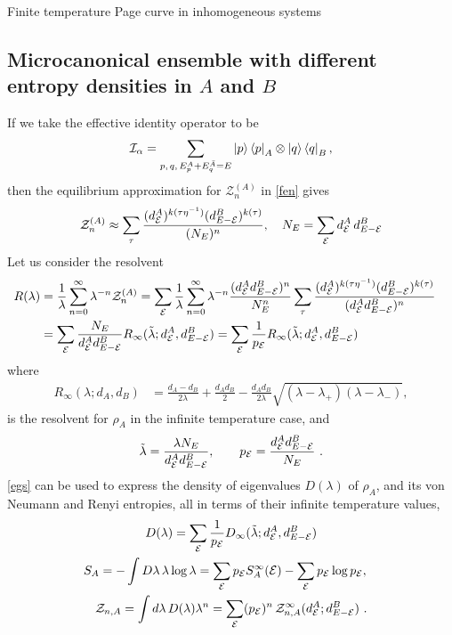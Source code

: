 \documentclass[a4paper,11pt]{article}
\newcommand{\be}{\begin{equation}}
\newcommand{\ee}{\end{equation}}
\newcommand{\bega}{\begin{gather}}
\def\ie{\begin{equation}\begin{aligned}}
\def\fe{\end{aligned}\end{equation}}
\newcommand\al{{\alpha}}
\newcommand\lam{\lambda}
\newcommand\ov{\over}
\newcommand\sE{{\ensuremath{{\mathcal E}}}}
\newcommand\sI{{\ensuremath{{\mathcal I}}}}
\newcommand\sZ{{\mathcal Z}}
\begin{document}
\begin{enumerate}
\begin{appendix}
\begin{section}{Finite temperature Page curve in inhomogeneous systems}
\subsection{Microcanonical ensemble with different entropy densities in $A$ and $B$}
If we take the effective identity operator to be 
\be 
\sI_{\al} = \sum_{p,\, q, \, E^A_p + E^{\bar A}_q = E} \ket{p}\bra{p}_{A} \otimes \ket{q}\bra{q}_{B}, 
\ee
then the equilibrium approximation for $\sZ_n^{(A)}$ in \eqref{fen} gives
\be 
\sZ_n^{(A)} \approx \sum_{\tau} {(d_{\sE}^A)^{k(\tau\eta^{-1})} (d^{B}_{E-\sE})^{k(\tau)} \ov (N_E)^n}, \quad N_E = \sum_{\sE} d_{\sE}^A \, d^{B}_{E-\sE} 
\ee
Let us consider the resolvent 
\ie
R(\lam) & = {1 \ov \lam} \sum_{n=0}^\infty \lam^{-n} \sZ_n^{(A)}
= \sum_{\sE} {1 \ov \lam} \sum_{n=0}^\infty \lam^{-n} \frac{(d_{\sE}^A d^{B}_{E-\sE})^n}{N_E^n} \sum_{\tau} {(d_{\sE}^A)^{k(\tau\eta^{-1})} (d^{B}_{E-\sE})^{k(\tau)} \ov (d_{\sE}^A d^{B}_{E-\sE})^n} \cr
& = \sum_{\sE} {N_E \ov d_{\sE}^A d^{B}_{E-\sE}} R_\infty (\tilde \lam; d_{\sE}^A, d^{B}_{E-\sE})
= \sum_\sE {1 \ov p_\sE} R_\infty (\tilde \lam; d_{\sE}^A, d^{B}_{E-\sE})
\label{egs}
\fe
where
 \begin{align} 
R_\infty (\lambda; d_A, d_{B}) &= \frac{d_A - d_{B}}{2\lambda} + \frac{d_Ad_{B}}{2} - \frac{d_A d_{B}}{2\lambda}\sqrt{\left(\lambda- \lam_+ \right)\left(\lambda-\lam_- \right)}, \label{resolvent}
\end{align}
is the resolvent for $\rho_A$ in the infinite temperature case, and 
\be 
\tilde \lam = {\lam N_E \ov d_{\sE}^A d^{B}_{E-\sE}}, \qquad p_\sE 
= {d_{\sE}^A d^{B}_{E-\sE} \ov N_E } \ .
\ee
\eqref{egs} can be used to express the density of eigenvalues $D(\lambda)$ of $\rho_A$, and its von Neumann and Renyi entropies, all in terms of their infinite temperature values, 
\bega 
D (\lam) = \sum_{\sE} %
{1 \ov p_\sE} D_\infty (\tilde \lam; d_{\sE}^A, d^{B}_{E-\sE}) \\
\label{entropy}
S_A = - \int D \lam \, \lam \log \lam = \sum_\sE p_\sE S_A^{\infty} (\sE) - \sum_\sE p_\sE \log p_{\sE}, \quad 
\\
\label{zn_se}
\sZ_{n,A} = \int d \lam \, D(\lam) \lam^n = \sum_\sE (p_\sE)^n \, \sZ_{n, A}^{\infty} (d_{\sE}^A ; d^{B}_{E-\sE}) \ .
\end{gather} 


\end{section}
\end{appendix}
\end{enumerate}
\end{document}
